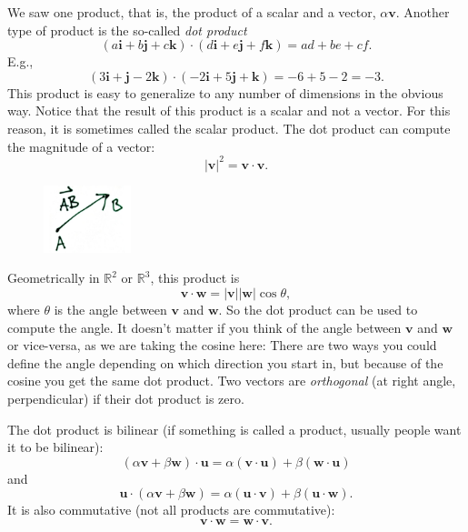 \documentclass[12pt]{article}
\newcommand{\sabs}[1]{\lvert {#1} \rvert}
\newcommand{\R}{{\mathbb{R}}}
\newcommand{\veci}{\mathbf{i}}
\newcommand{\vecj}{\mathbf{j}}
\newcommand{\veck}{\mathbf{k}}
\begin{document}
We saw one product, that is, the product of a scalar and a vector,
$\alpha \mathbf{v}$.
Another type of product is the so-called \emph{dot product}
\[
( a \veci + b \vecj + c \veck ) \cdot
( d \veci + e \vecj + f \veck ) =
ad + be + cf .
\]
E.g.,
\[
( 3 \veci + \vecj -2 \veck ) \cdot
( - 2\veci + 5 \vecj + \veck ) =
-6 + 5 -2 = -3 .
\]
This product is easy to generalize to any number of dimensions in the obvious way.
Notice that the result of this product is a scalar and not a vector.
For this reason, it is sometimes called the scalar product.
The dot product can compute the magnitude of a vector:
\[
\sabs{\mathbf{v}}^2 = \mathbf{v} \cdot \mathbf{v} .
\]
\begin{figure}
\vspace*{-0.35in}
\includegraphics[width=1.0in,page=2]{figures1}
\end{figure}
Geometrically in $\R^2$ or $\R^3$, this product is
\[
\mathbf{v} \cdot \mathbf{w} = \sabs{\mathbf{v}} \sabs{\mathbf{w}} \cos \theta ,
\]
where $\theta$ is the angle between $\mathbf{v}$ and $\mathbf{w}$.
So the dot product can be used to compute the angle.
It doesn't matter if you think of the angle
between $\mathbf{v}$ and $\mathbf{w}$ or vice-versa, as we are taking the cosine here:
There are two ways you could define the angle depending on which direction you start in,
but because of the cosine you get the same dot product.
Two vectors are \emph{orthogonal}
(at right angle, perpendicular) if their dot product is zero.

The dot product is bilinear (if something is called a product, usually people want it to be bilinear):
\[
( \alpha \mathbf{v} + \beta \mathbf{w} ) \cdot \mathbf{u}
=
\alpha (\mathbf{v} \cdot \mathbf{u}) + \beta (\mathbf{w} \cdot \mathbf{u})
\]
and
\[
\mathbf{u} \cdot
( \alpha \mathbf{v} + \beta \mathbf{w} )
=
\alpha (\mathbf{u} \cdot \mathbf{v}) + \beta (\mathbf{u} \cdot \mathbf{w}) .
\]
It is also commutative (not all products are commutative):
\[
\mathbf{v} \cdot \mathbf{w} = \mathbf{w} \cdot \mathbf{v} .
\]
\end{document}
